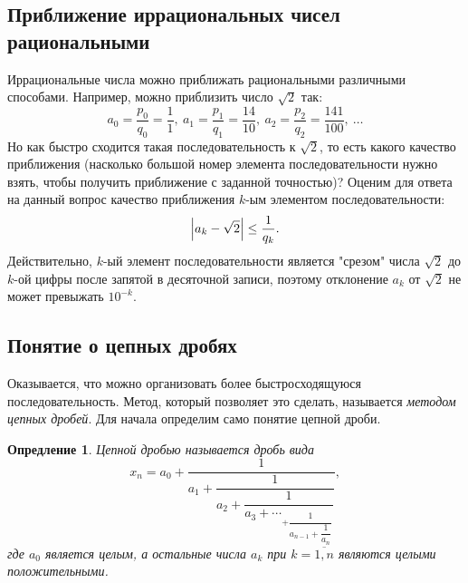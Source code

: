 \documentclass[12pt]{article}
\newtheorem{definition}{Опредление}[section]
\begin{document}
\subsection{Приближение иррациональных чисел рациональными}\label{ss:42}
Иррациональные числа можно приближать рациональными различными способами. Например, можно приблизить число $\sqrt{2}$ так:
\begin{equation}
    a_0 = \dfrac{p_0}{q_0} = \dfrac{1}{1},\ a_1 =\dfrac{p_1}{q_1} = \dfrac{14}{10},\ a_2 = \dfrac{p_2}{q_2} =\dfrac{141}{100},\ \ldots
\end{equation}
Но как быстро сходится такая последовательность к $\sqrt{2}$, то есть какого качество приближения (насколько большой номер элемента последовательности нужно взять, чтобы получить приближение с заданной точностью)? Оценим для ответа на данный вопрос качество приближения $k$\--ым элементом последовательности:
\begin{equation}
    \abs{a_k - \sqrt{2}} \le \dfrac{1}{q_k}.
\end{equation}
Действительно, $k$\--ый элемент последовательности является "срезом"{} числа $\sqrt{2}$ до $k$\--ой цифры после запятой в десяточной записи, поэтому отклонение $a_k$ от $\sqrt{2}$ не может превыжать $10^{-k}$.
\subsection{Понятие о цепных дробях}
Оказывается, что можно организовать более быстросходящуюся последовательность. Метод, который позволяет это сделать, называется \emph{методом цепных дробей}. Для начала определим само понятие цепной дроби.
\begin{definition}\label{def:41}
Цепной дробью называется дробь вида
\begin{equation}
    x_n = a_0 + \dfrac{1}{a_1 + \dfrac{1}{a_2+ \dfrac{1}{a_3 + \cdots_{+\dfrac{1}{a_{n-1} + \dfrac{1}{a_n}}}}}},
\end{equation}
где $a_0$ является целым, а остальные числа $a_k$ при $k=\overline{1,n}$ являются целыми положительными.
\end{definition}
\end{document}
